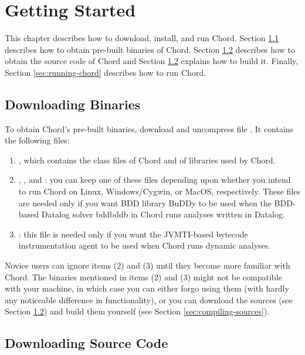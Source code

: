 \chapter{Getting Started}
\label{chap:getting-started}


This chapter describes how to download, install, and run Chord.
Section \ref{sec:downloading-binaries} describes how to obtain
pre-built binaries of Chord.  Section \ref{sec:downloading-sources}
describes how to obtain the source code of Chord and Section
\ref{sec:downloading-sources} explains how to build it.  Finally,
Section \ref{sec:running-chord} describes how to run Chord.

\section{Downloading Binaries}
\label{sec:downloading-binaries}

To obtain Chord's pre-built binaries, download and uncompress file
.
It contains the following files:

\begin{enumerate}
\item
{}, which contains the class files of Chord and of
libraries used by Chord.
\item
{}, , and : you
can keep one of these files depending upon whether you intend to run
Chord on Linux, Windows/Cygwin, or MacOS, respectively.  These files
are needed only if you want BDD library BuDDy to be used when the
BDD-based Datalog solver bddbddb in Chord runs analyses written in
Datalog.
\item
{}: this file is needed only if you want
the JVMTI-based bytecode instrumentation agent to be used when Chord
runs dynamic analyses.
\end{enumerate}

Novice users can ignore items (2) and (3) until they become more
familiar with Chord.  The binaries mentioned in items (2) and (3)
might not be compatible with your machine, in which case you can
either forgo using them (with hardly any noticeable difference in
functionality), or you can download the sources (see Section
\ref{sec:downloading-sources}) and build them yourself (see Section
\ref{sec:compiling-sources}).

\section{Downloading Source Code}
\label{sec:downloading-sources}

